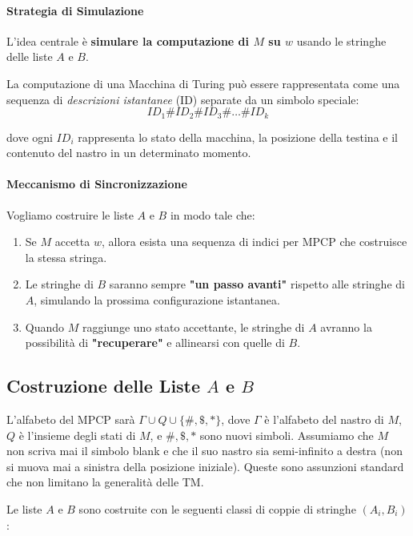 \documentclass[a4paper]{article}
\theoremstyle{definition} %
\theoremstyle{remark} %
\begin{document}
\paragraph{Strategia di Simulazione}
L'idea centrale è \textbf{simulare la computazione di $M$ su $w$} usando le stringhe delle liste $A$ e $B$. 

La computazione di una Macchina di Turing può essere rappresentata come una sequenza di \emph{descrizioni istantanee} (ID) separate da un simbolo speciale:
$$ID_1 \# ID_2 \# ID_3 \# \dots \# ID_k$$

dove ogni $ID_i$ rappresenta lo stato della macchina, la posizione della testina e il contenuto del nastro in un determinato momento.

\paragraph{Meccanismo di Sincronizzazione}
Vogliamo costruire le liste $A$ e $B$ in modo tale che:
\begin{enumerate}
    \item Se $M$ accetta $w$, allora esista una sequenza di indici per MPCP che costruisce la stessa stringa.
    \item Le stringhe di $B$ saranno sempre \textbf{"un passo avanti"} rispetto alle stringhe di $A$, simulando la prossima configurazione istantanea.
    \item Quando $M$ raggiunge uno stato accettante, le stringhe di $A$ avranno la possibilità di \textbf{"recuperare"} e allinearsi con quelle di $B$.
\end{enumerate}

\subsection{Costruzione delle Liste $A$ e $B$}
L'alfabeto del MPCP sarà $\Gamma \cup Q \cup \{\#, \$, *\}$, dove $\Gamma$ è l'alfabeto del nastro di $M$, $Q$ è l'insieme degli stati di $M$, e $\#, \$, *$ sono nuovi simboli.
Assumiamo che $M$ non scriva mai il simbolo blank e che il suo nastro sia semi-infinito a destra (non si muova mai a sinistra della posizione iniziale). Queste sono assunzioni standard che non limitano la generalità delle TM.

Le liste $A$ e $B$ sono costruite con le seguenti classi di coppie di stringhe $(A_i, B_i)$:
\end{document}
